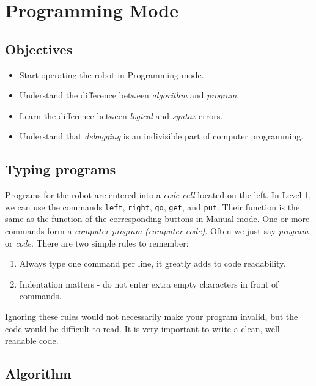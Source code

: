 \section{Programming Mode} \label{sec:bridge}

\subsection{Objectives} 
 
\begin{itemize}
\item Start operating the robot in Programming mode.
\item Understand the difference between {\em algorithm} and {\em program}. 
\item Learn the difference between {\em logical} and {\em syntax} errors.
\item Understand that {\em debugging} is an indivisible part of computer programming.
\end{itemize}

\subsection{Typing programs}

Programs for the robot are entered into a {\em code cell} located on the left.
In Level 1, we can use the commands {\tt left}, {\tt right}, {\tt go}, {\tt get}, and {\tt put}.
Their function is the same as the function of the corresponding buttons in Manual mode.
One or more commands form a {\em computer program (computer code)}. Often 
we just say {\em program} or {\em code}. There are two simple rules to remember:\\

\begin{gbox}
\begin{enumerate}
\item Always type one command per line, it greatly adds to code readability.
\item Indentation matters - do not enter extra empty characters in front of commands. 
\end{enumerate}
\end{gbox}
\vspace{6mm}

\noindent
Ignoring these rules would not necessarily make your program invalid, 
but the code would be difficult to read. It is very important to write 
a clean, well readable code. 

\subsection{Algorithm} \label{subsec:interm1}


